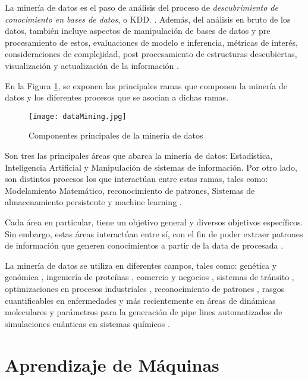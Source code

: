 La minería de datos es el paso de análisis del proceso de \textit{descubrimiento de conocimiento en bases de datos}, o KDD. \cite{fayyad1996kdd}. Además, del análisis en bruto de los datos, también incluye aspectos de manipulación de bases de datos y pre procesamiento de estos, evaluaciones de modelo e inferencia, métricas de interés, consideraciones de complejidad, post procesamiento de estructuras descubiertas, visualización y actualización de la información \cite{berry2004data}.

En la Figura \ref{intro1}, se exponen las principales ramas que componen la minería de datos y los diferentes procesos que se asocian a dichas ramas.

\begin{figure}[!h]
	
	\centering
	\texttt{[image: dataMining.jpg]}
	\caption{Componentes principales de la minería de datos}
	\label{intro1}
\end{figure}

Son tres las principales áreas que abarca la minería de datos: Estadística, Inteligencia Artificial y Manipulación de sistemas de información. Por otro lado, son distintos procesos los que interactúan entre estas ramas, tales como: Modelamiento Matemático, reconocimiento de patrones, Sistemas de almacenamiento persistente y machine learning \cite{hand2006data}.

Cada área en particular, tiene un objetivo general y diversos objetivos específicos. Sin embargo, estas áreas interactúan entre sí, con el fin de poder extraer patrones de información que generen conocimientos a partir de la data de procesada \cite{berry2004data}.

La minería de datos se utiliza en diferentes campos, tales como: genética y genómica \cite{Lee2008, Rebhan1998}, ingeniería de proteínas \cite{han2009research, 4548625, li2008fast}, comercio y negocios \cite{hofmann2013rapidminer}, sistemas de tránsito \cite{Ma2013}, optimizaciones en procesos industriales \cite{Chien2008, 8051033, 983448}, reconocimiento de patrones \cite{jain1988algorithms, fayyad1996data}, rasgos cuantificables en enfermedades \cite{Yoo2012, obenshain2004, LDuan} y más recientemente en áreas de dinámicas moleculares \cite{Chen2017, Yang:2005:GFM:1081870.1081962} y parámetros para la generación de pipe lines automatizados de simulaciones cuánticas en sistemas químicos \cite{MAO2004787, PhysRevLett.91.135503, Ramakrishnan2015}.

\section{Aprendizaje de Máquinas}

